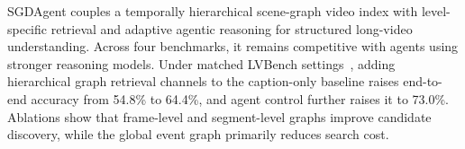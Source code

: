 \documentclass[letterpaper]{article} %
\begin{document}
SGDAgent couples a temporally hierarchical scene-graph video index with level-specific retrieval and adaptive agentic reasoning for structured long-video understanding.
Across four benchmarks, it remains competitive with agents using stronger reasoning models.
Under matched LVBench settings~\cite{lvbench}, adding hierarchical graph retrieval channels to the caption-only baseline raises end-to-end accuracy from 54.8\% to 64.4\%, and agent control further raises it to 73.0\%.
Ablations show that frame-level and segment-level graphs improve candidate discovery, while the global event graph primarily reduces search cost.




\end{document}

